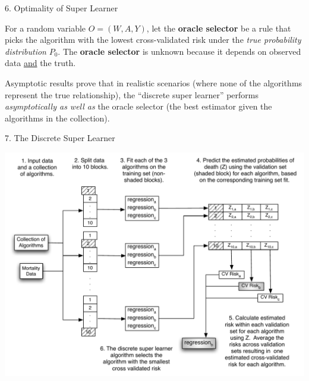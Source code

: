 \documentclass[12pt,t,handout]{beamer}
\begin{document}
\begin{frame}[c]{6. Optimality of Super Learner}

\vspace*{1mm}

\centering

  For a random variable $O = (W, A, Y)$, let the \textbf{oracle selector} be a
  rule that picks the algorithm with the lowest cross-validated risk under the
  \textit{true probability distribution} $P_{0}$. The \textbf{oracle selector}
  is unknown because it depends on observed data \underline{and} the truth.

\vspace{1em}

  Asymptotic results prove that in realistic scenarios (where none of the
  algorithms represent the true relationship), the ``discrete super learner''
  performs \textit{asymptotically as well as} the oracle selector (the best
  estimator given the algorithms in the collection).

\end{frame}


\begin{frame}[c]{7. The Discrete Super Learner}

\vspace*{3mm}

\centering

\includegraphics[scale=0.45]{Figs/discreteSL.pdf}

\note{
}
\end{frame}
\end{document}
